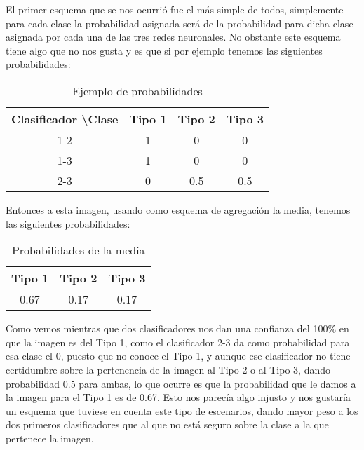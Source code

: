 El primer esquema que se nos ocurrió fue el más simple de todos, simplemente para cada clase la probabilidad asignada será  de la probabilidad para dicha clase asignada por cada una de las tres redes neuronales. No obstante este esquema tiene algo que no nos gusta y es que si por ejemplo tenemos las siguientes probabilidades:

\begin{table}[H]
\centering
\caption{Ejemplo de probabilidades}
\label{my-label}
\begin{tabular}{|c|c|c|c|}
\hline
Clasificador \textbackslash Clase & Tipo 1 & Tipo 2 & Tipo 3 \\ \hline
1-2                               & 1      & 0      & 0      \\ \hline
1-3                               & 1      & 0      & 0      \\ \hline
2-3                               & 0      & 0.5    & 0.5    \\ \hline
\end{tabular}
\end{table}

Entonces a esta imagen, usando como esquema de agregación la media, tenemos las siguientes probabilidades:

\begin{table}[H]
\centering
\caption{Probabilidades de la media}
\begin{tabular}{|c|c|c|}
\hline
Tipo 1 & Tipo 2 & Tipo 3 \\ \hline
0.67   & 0.17   & 0.17   \\ \hline
\end{tabular}
\end{table}

Como vemos mientras que dos clasificadores nos dan una confianza del 100\% en que la imagen es del Tipo 1, como el clasificador 2-3 da como probabilidad para esa clase el 0, puesto que no conoce el Tipo 1, y aunque ese clasificador no tiene certidumbre sobre la pertenencia de la imagen al Tipo 2 o al Tipo 3, dando probabilidad 0.5 para ambas, lo que ocurre es que la probabilidad que le damos a la imagen para el Tipo 1 es de 0.67. Esto nos parecía algo injusto y nos gustaría un esquema que tuviese en cuenta este tipo de escenarios, dando mayor peso a los dos primeros clasificadores que al que no está seguro sobre la clase a la que pertenece la imagen.\\

